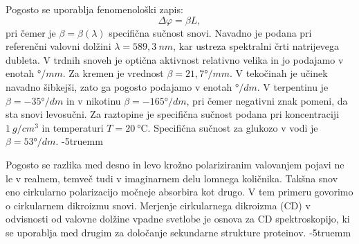 Pogosto se uporablja fenomenološki zapis:
\begin{equation}
\Delta \varphi = \beta L,
\label{eq:09_50}
\end{equation}
pri čemer je $\beta = \beta (\lambda)$ specifična sučnost snovi.
Navadno je podana pri referenčni
valovni dolžini $\lambda = 589,3~\si{nm}$, kar ustreza spektralni črti natrijevega dubleta. V
trdnih snoveh je optična aktivnost relativno velika in jo podajamo v enotah $\si{\degree}/\si{mm}$. Za 
kremen je vrednost $\beta = 21,7\si{\degree}/\si{mm}$. V tekočinah je učinek
navadno šibkejši, zato ga pogosto podajamo v enotah $\si{\degree}/\si{dm}$. V terpentinu
je $\beta = -35\si{\degree}/\si{dm}$ in v nikotinu $\beta = -165\si{\degree}/\si{dm}$,
pri čemer negativni znak pomeni, da sta snovi levosučni. Za raztopine je specifična sučnost
podana pri koncentraciji $1~\si{g/cm^3}$ in temperaturi $T = 20~\si{\celsius}$. 
Specifična sučnost za glukozo v vodi je $\beta = 53\si{\degree}/\si{dm}$.
\vglue-5truemm
\begin{remark}
Pogosto se razlika med desno in levo krožno polariziranim valovanjem pojavi ne le v realnem, 
temveč tudi v imaginarnem delu lomnega količnika. Takšna snov eno cirkularno polarizacijo močneje
absorbira kot drugo. V tem primeru govorimo o cirkularnem dikroizmu snovi.
Merjenje cirkularnega
dikroizma (CD) v odvisnosti od valovne dolžine vpadne svetlobe je osnova za CD spektroskopijo, ki
se uporablja med drugim za določanje sekundarne strukture proteinov. 
\vglue-5truemm
\end{remark}

